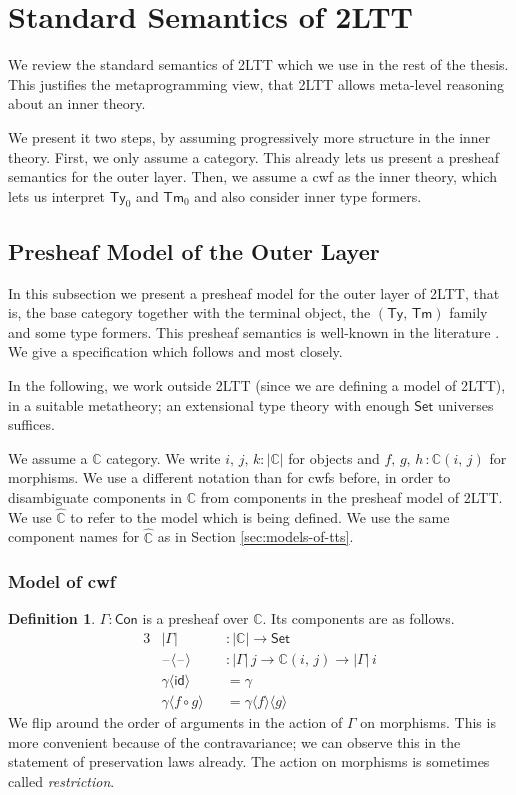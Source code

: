 \documentclass[12pt,a4paper,twoside,openany]{book}
\theoremstyle{remark}
\theoremstyle{definition}
\newtheorem{mydefinition}{Definition}
\theoremstyle{theorem}
\newcommand{\mbb}[1]{\mathbb{#1}}
\newcommand{\id}{\mathsf{id}}
\newcommand{\Con}{\mathsf{Con}}
\newcommand{\Tm}{\mathsf{Tm}}
\newcommand{\Ty}{\mathsf{Ty}}
\newcommand{\blank}{\mathord{\hspace{1pt}\text{--}\hspace{1pt}}}
\newcommand{\Set}{\mathsf{Set}}
\newcommand{\mbbC}{\mbb{C}}
\newcommand{\hmbbC}{\hat{\mbb{C}}}
\newcommand{\lab}{\langle}
\newcommand{\rab}{\rangle}
\begin{document}
\section{Standard Semantics of 2LTT}

We review the standard semantics of 2LTT which we use in the rest of the
thesis. This justifies the metaprogramming view, that 2LTT allows meta-level
reasoning about an inner theory.

We present it two steps, by assuming progressively more structure in the inner
theory. First, we only assume a category. This already lets us present a
presheaf semantics for the outer layer. Then, we assume a cwf as the inner
theory, which lets us interpret $\Ty_0$ and $\Tm_0$ and also consider inner type
formers.

\subsection{Presheaf Model of the Outer Layer}

In this subsection we present a presheaf model for the outer layer of 2LTT, that
is, the base category together with the terminal object, the $(\Ty,\,\Tm)$
family and some type formers. This presheaf semantics is well-known in the
literature \cite{TODO}. We give a specification which follows \cite{TODO} and
\cite{TODO} most closely.

In the following, we work outside 2LTT (since we are defining a model of 2LTT),
in a suitable metatheory; an extensional type theory with enough $\Set$
universes suffices.

We assume a $\mbbC$ category. We write $i,\,j,\,k : |\mbbC|$ for objects and
$f,\,g,\,h\,: \mbbC(i,\,j)$ for morphisms. We use a different notation than for
cwfs before, in order to disambiguate components in $\mbbC$ from components in
the presheaf model of 2LTT. We use $\hmbbC$ to refer to the model which is being
defined. We use the same component names for $\hmbbC$ as in Section
\ref{sec:models-of-tts}.

\subsubsection{Model of cwf}

\begin{mydefinition}
$\Gamma : \Con$ is a presheaf over $\mbbC$. Its components
are as follows.
\begin{alignat*}{3}
  & |\Gamma|             &&: |\mbbC| \to \Set \\
  & \blank\lab\blank\rab &&: |\Gamma|\,j \to \mbbC(i,\,j) \to |\Gamma|\,i\\
  & \gamma\lab\id\rab &&= \gamma \\
  & \gamma\lab f\circ g\rab &&= \gamma \lab f \rab \lab g \rab
\end{alignat*}
We flip around the order of arguments in the action of $\Gamma$ on
morphisms. This is more convenient because of the contravariance; we can observe
this in the statement of preservation laws already. The action on morphisms is
sometimes called \emph{restriction}.
\end{mydefinition}
\end{document}

